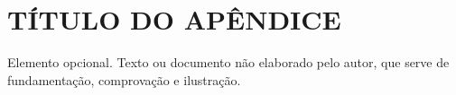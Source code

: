 \chapter[]{TÍTULO DO APÊNDICE}
\label{apendice:A}

Elemento opcional. Texto ou documento não elaborado pelo autor, que serve de fundamentação, comprovação e ilustração.
